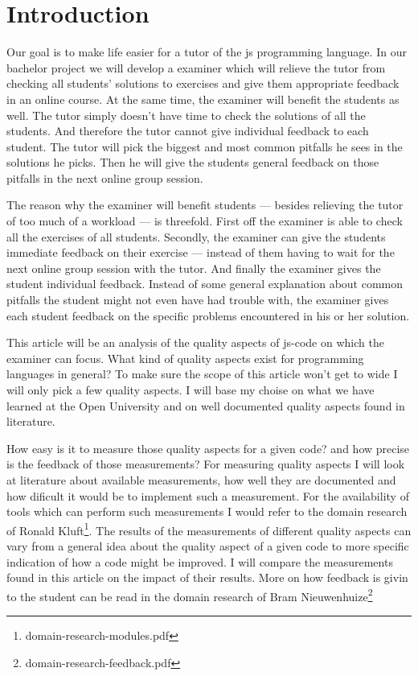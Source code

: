 \section{Introduction} 

Our goal is to make life easier for a tutor
of the \gls{js} programming language.
In our bachelor project we will develop a \gls{examiner}
which will relieve the \gls{tutor} from checking
all \glspl{student}' \glspl{solution} to \glspl{exercise}
and give them appropriate feedback in an online course.
At the same time, the \gls{examiner} will benefit the \glspl{student} as well.
The \gls{tutor} simply doesn't have time
to check the \glspl{solution} of all the \glspl{student}.
And therefore the \gls{tutor} cannot give individual \gls{feedback}
to each \gls{student}.
The \gls{tutor} will pick the biggest and most common pitfalls he sees
in the \glspl{solution} he picks.
Then he will give the \glspl{student} general feedback on those pitfalls
in the next online group session.

The reason why the \gls{examiner} will benefit \glspl{student} --- besides
relieving the \gls{tutor} of too much of a workload --- is threefold.
First off the \gls{examiner} is able
to check all the \glspl{exercise} of all \glspl{student}.
Secondly, the \gls{examiner} can give the \glspl{student}
immediate \gls{feedback} on their \gls{exercise} ---
instead of them having to wait for
the next online group session with the \gls{tutor}.
And finally the \gls{examiner} gives the \gls{student}
individual \gls{feedback}.
Instead of some general explanation
about common pitfalls the \gls{student} might not even have had trouble with,
the \gls{examiner} gives each \gls{student} \gls{feedback}
on the specific problems encountered in his or her \gls{solution}.

This article will be an analysis of the quality aspects of \gls{js-code}
on which the \gls{examiner} can focus.
What kind of quality aspects exist for programming languages in general?
To make sure the scope of this article won't get to wide
I will only pick a few quality aspects.
I will base my choise on what we have learned at the Open University
and on well documented quality aspects found in literature.

How easy is it to measure those quality aspects for a given \gls{code}?
and how precise is the \gls{feedback} of those measurements?
For measuring quality aspects
I will look at literature about available measurements,
how well they are documented
and how dificult it would be to implement such a measurement.
For the availability of \glspl{tool} which can perform such measurements
I would refer to the domain research of
Ronald Kluft\footnote{domain-research-modules.pdf}.
The results of the measurements of different quality aspects can vary from
a general idea about the quality aspect of a given \gls{code}
to more specific indication of how a \gls{code} might be improved.
I will compare the measurements found in this article
on the impact of their results.
More on how \gls{feedback} is givin to the student
can be read in the domain research of
Bram Nieuwenhuize\footnote{domain-research-feedback.pdf}

